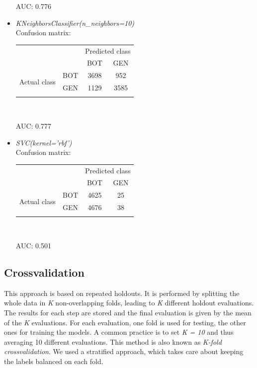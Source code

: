 \begin{itemize}
	AUC: 0.776
	
	\item[\PencilRight] \textit{KNeighborsClassifier(n\_neighbors=10)}\\
	Confusion matrix:
	
	{
		\centering
		\begin{tabular}{@{}cc|cc@{}}
			\multicolumn{1}{c}{} &\multicolumn{1}{c}{} &\multicolumn{2}{c}{Predicted class} \\ 
			\multicolumn{1}{c}{} & 
			\multicolumn{1}{c|}{} & 
			\multicolumn{1}{c}{BOT} & 
			\multicolumn{1}{c}{GEN}  \\
			\cline{2-4}
			\multirow[c]{2}{*}{Actual class}
			& BOT  & 3698 &  952\\
			& GEN  & 1129 & 3585\\
			\cline{2-4}\\
		\end{tabular}\\
	}
	
	AUC: 0.777
	
	\item[\PencilRight] \textit{SVC(kernel='rbf')}\\
	Confusion matrix:
	
	{
		\centering
		\begin{tabular}{@{}cc|cc@{}}
			\multicolumn{1}{c}{} &\multicolumn{1}{c}{} &\multicolumn{2}{c}{Predicted class} \\ 
			\multicolumn{1}{c}{} & 
			\multicolumn{1}{c|}{} & 
			\multicolumn{1}{c}{BOT} & 
			\multicolumn{1}{c}{GEN}  \\
			\cline{2-4}
			\multirow[c]{2}{*}{Actual class}
			& BOT  & 4625 & 25\\
			& GEN  & 4676 & 38\\
			\cline{2-4}\\
		\end{tabular}\\
	}
	
	AUC: 0.501
\end{itemize}

\subsection{Crossvalidation}
This approach is based on repeated holdouts. It is performed by splitting the whole data in \textit{K} non-overlapping folds, leading to \textit{K} different holdout evaluations. The results for each step are stored and the final evaluation is given by the mean of the \textit{K} evaluations. For each evaluation, one fold is used for testing, the other ones for training the models. A common practice is to set \textit{K = 10} and thus averaging 10 different evaluations.
This method is also known as \textit{K-fold crossvalidation}. We used a stratified approach, which takes care about keeping the labels balanced on each fold.

